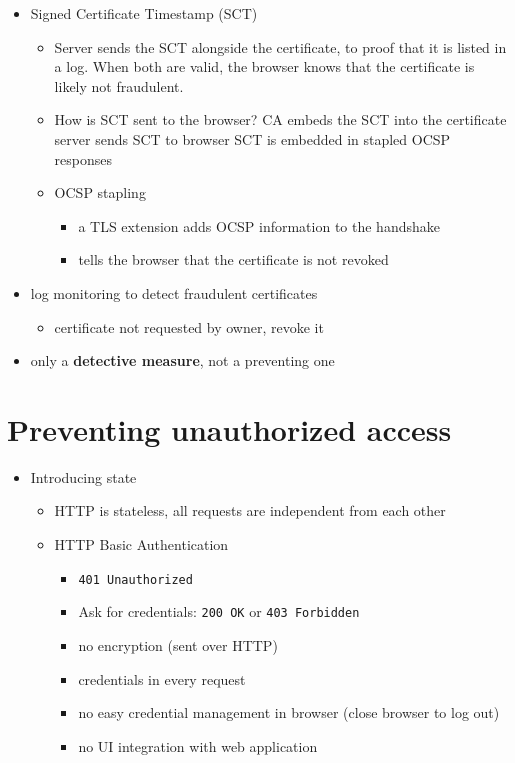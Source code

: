\documentclass[12pt,titlepage,a4paper]{report}
\begin{document}
\begin{itemize}
\begin{itemize}
			\item Signed Certificate Timestamp (SCT)
			\begin{itemize}
				\item Server sends the SCT alongside the certificate, to proof that it is listed in a log. When both are valid, the browser knows that the certificate is likely not fraudulent.
				\item How is SCT sent to the browser?
					\subitem CA embeds the SCT into the certificate
					\subitem server sends SCT to browser
					\subitem SCT is embedded in stapled OCSP responses
				\item OCSP stapling
				\begin{itemize}
					\item a TLS extension adds OCSP information to the handshake
					\item tells the browser that the certificate is not revoked
				\end{itemize}
			\end{itemize}
			\item log monitoring to detect fraudulent certificates
			\begin{itemize}
				\item certificate not requested by owner, revoke it
			\end{itemize}
		\item only a \textbf{detective measure}, not a preventing one
		\end{itemize}
	\end{itemize}
	
	
	\section{Preventing unauthorized access}
	\begin{itemize}
		\item Introducing state
		\begin{itemize}
			\item HTTP is stateless, all requests are independent from each other
			\item HTTP Basic Authentication
			\begin{itemize}
				\item \texttt{401 Unauthorized}
				\item Ask for credentials: \texttt{200 OK} or \texttt{403 Forbidden}
				\item no encryption (sent over HTTP)
				\item credentials in every request
				\item no easy credential management in browser (close browser to log out)
				\item no UI integration with web application
			\end{itemize}
		\end{itemize}
	\end{itemize}
\end{document}
